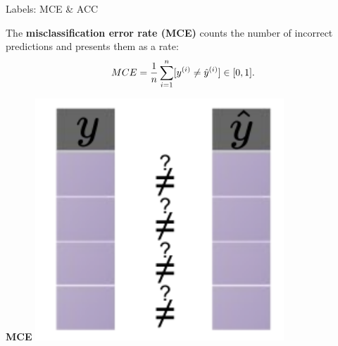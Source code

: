 \documentclass[11pt,compress,t,notes=noshow, xcolor=table]{beamer}
\begin{document}
\begin{vbframe}{Labels: MCE \& ACC}

\begin{minipage}[t]{0.75\textwidth} 
  \small
  The \textbf{misclassification error rate (MCE)} counts the number of incorrect 
  predictions and presents them as a rate:
  $$ MCE = \frac{1}{n} \sum\limits_{i=1}^n [y^{(i)} \neq \hat{y}^{(i)}] \in [0, 1]. $$
\end{minipage}%
\begin{minipage}[t]{0.25\textwidth}
  \centering
  \begin{center}
    \textbf{MCE}
    \includegraphics[width=0.7\textwidth]
    {figure_man/eval-classif-loss-compare-mce.pdf}
  \end{center}
\end{minipage}

\lz


\end{vbframe}
\end{document}
